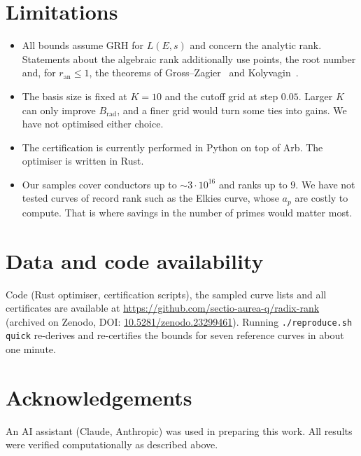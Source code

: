 \documentclass[11pt]{amsart}
\theoremstyle{remark}
\theoremstyle{definition}
\newcommand{\ran}{r_{\mathrm{an}}}
\begin{document}
\section{Limitations}
\begin{itemize}
\item All bounds assume GRH for $L(E,s)$ and concern the analytic rank. Statements about the algebraic rank additionally use points, the root number and, for $\ran\le1$, the theorems of Gross--Zagier~\cite{GZ} and Kolyvagin~\cite{Kolyvagin}.
\item The basis size is fixed at $K=10$ and the cutoff grid at step $0.05$. Larger $K$ can only improve $B_{\mathrm{rad}}$, and a finer grid would turn some ties into gains. We have not optimised either choice.
\item The certification is currently performed in Python on top of Arb. The optimiser is written in Rust.
\item Our samples cover conductors up to $\sim3\cdot10^{16}$ and ranks up to $9$. We have not tested curves of record rank such as the Elkies curve, whose $a_p$ are costly to compute. That is where savings in the number of primes would matter most.
\end{itemize}

\section*{Data and code availability}
Code (Rust optimiser, certification scripts), the sampled curve lists and all certificates are available at \url{https://github.com/sectio-aurea-q/radix-rank} (archived on Zenodo, DOI: \href{https://doi.org/10.5281/zenodo.23299461}{10.5281/zenodo.23299461}). Running \texttt{./reproduce.sh quick} re-derives and re-certifies the bounds for seven reference curves in about one minute.

\section*{Acknowledgements}
An AI assistant (Claude, Anthropic) was used in preparing this work. All results were verified computationally as described above.
\end{document}
